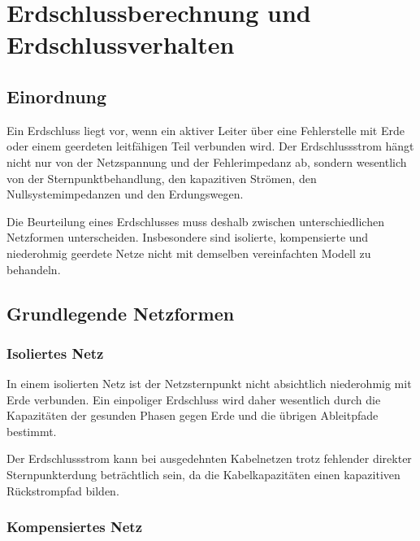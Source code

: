 
\chapter{Erdschlussberechnung und Erdschlussverhalten}
\label{chap:09-erdschluss}

\section{Einordnung}

Ein Erdschluss liegt vor, wenn ein aktiver Leiter über eine Fehlerstelle
mit Erde oder einem geerdeten leitfähigen Teil verbunden wird. Der
Erdschlussstrom hängt nicht nur von der Netzspannung und der Fehlerimpedanz
ab, sondern wesentlich von der Sternpunktbehandlung, den kapazitiven
Strömen, den Nullsystemimpedanzen und den Erdungswegen.

Die Beurteilung eines Erdschlusses muss deshalb zwischen unterschiedlichen
Netzformen unterscheiden. Insbesondere sind isolierte, kompensierte und
niederohmig geerdete Netze nicht mit demselben vereinfachten Modell
zu behandeln.

\section{Grundlegende Netzformen}

\subsection{Isoliertes Netz}

In einem isolierten Netz ist der Netzsternpunkt nicht absichtlich niederohmig
mit Erde verbunden. Ein einpoliger Erdschluss wird daher wesentlich durch
die Kapazitäten der gesunden Phasen gegen Erde und die übrigen
Ableitpfade bestimmt.

Der Erdschlussstrom kann bei ausgedehnten Kabelnetzen trotz fehlender
direkter Sternpunkterdung beträchtlich sein, da die Kabelkapazitäten
einen kapazitiven Rückstrompfad bilden.

\subsection{Kompensiertes Netz}

